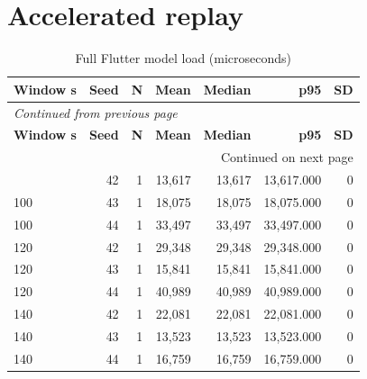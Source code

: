 \documentclass[10pt,a4paper]{article}
\begin{document}
\section{Accelerated replay}
\begingroup\small\setlength{\tabcolsep}{4pt}\renewcommand{\arraystretch}{1.12}
\begin{longtable}{@{}lrrrrrr@{}}
\caption{Full Flutter model load (microseconds)}\\
\toprule
\textbf{Window s} & \textbf{Seed} & \textbf{N} & \textbf{Mean} & \textbf{Median} & \textbf{p95} & \textbf{SD} \\
\midrule\endfirsthead
\multicolumn{7}{l}{\small\itshape Continued from previous page}\\
\toprule
\textbf{Window s} & \textbf{Seed} & \textbf{N} & \textbf{Mean} & \textbf{Median} & \textbf{p95} & \textbf{SD} \\
\midrule\endhead
\midrule\multicolumn{7}{r}{\small Continued on next page}\\\endfoot
\bottomrule\endlastfoot
100 & 42 & 1 & 13,617 & 13,617 & 13,617.000 & 0 \\
100 & 43 & 1 & 18,075 & 18,075 & 18,075.000 & 0 \\
100 & 44 & 1 & 33,497 & 33,497 & 33,497.000 & 0 \\
120 & 42 & 1 & 29,348 & 29,348 & 29,348.000 & 0 \\
120 & 43 & 1 & 15,841 & 15,841 & 15,841.000 & 0 \\
120 & 44 & 1 & 40,989 & 40,989 & 40,989.000 & 0 \\
140 & 42 & 1 & 22,081 & 22,081 & 22,081.000 & 0 \\
140 & 43 & 1 & 13,523 & 13,523 & 13,523.000 & 0 \\
140 & 44 & 1 & 16,759 & 16,759 & 16,759.000 & 0 \\
\end{longtable}\endgroup
\begingroup\small\setlength{\tabcolsep}{4pt}\renewcommand{\arraystretch}{1.12}
\end{document}

